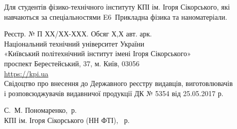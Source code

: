{\begin{alwayssingle}
		Для студентів фізико-технічного інституту КПІ ім. Ігоря Сікорського, які навчаються за спеціальностями E6~Прикладна фізика та наноматеріали.

		\vfill

		\begin{center}\scriptsize
			Реєстр. № П ХХ/ХХ-ХХХ. Обсяг Х,Х авт. арк.\\
			Національний технічний університет України \\
			«Київський політехнічний інститут імені Ігоря Сікорського»\\
			проспект Берестейський, 37, м. Київ, 03056\\
			\url{https://kpi.ua}\\
			Свідоцтво про внесення до Державного реєстру видавців, виготовлювачів \\
			і розповсюджувачів видавничої продукції ДК № 5354 від 25.05.2017 р.
		\end{center}

		\vfill
		
		\begin{flushright}
			\begin{minipage}[t]{0.6\linewidth}\small
				\textcopyright{} С.~М. Пономаренко, \the\year\,р. \\
				\textcopyright{}  КПІ ім. Ігоря Сікорського (НН ФТІ), \the\year~р.
			\end{minipage}
		\end{flushright}
		\newpage%
	\end{alwayssingle}
}

